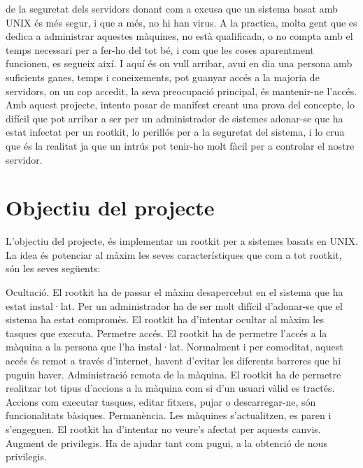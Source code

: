 \documentclass[a4paper]{article}
\begin{document}
de la seguretat dels servidors donant com a excusa que un sistema basat amb UNIX és
més segur, i que a més, no hi han virus. A la practica, molta gent que es dedica a
administrar aquestes màquines, no està qualificada, o no compta amb el temps necessari
per a fer-ho del tot bé, i com que les coses aparentment funcionen, es segueix així.
I aquí és on vull arribar, avui en dia una persona amb suficients ganes, temps i
coneixements, pot guanyar accés a la majoria de servidors, on un cop accedit, la seva
preocupació principal, és mantenir-ne l'accés.
Amb aquest projecte, intento posar de manifest creant una prova del concepte, lo difícil
que pot arribar a ser per un administrador de sistemes adonar-se que ha estat infectat per
un rootkit, lo perillós per a la seguretat del sistema, i lo crua que és la realitat ja que un
intrús pot tenir-ho molt fàcil per a controlar el nostre servidor.

\section{Objectiu del projecte}

L'objectiu del projecte, és implementar un rootkit per a sistemes basats en UNIX. La idea
és potenciar al màxim les seves característiques que com a tot rootkit, són les seves
següents:

Ocultació. El rootkit ha de passar el màxim desapercebut en el sistema que ha
estat instal·lat. Per un administrador ha de ser molt difícil d'adonar-se que el
sistema ha estat compromès. El rootkit ha d'intentar ocultar al màxim les tasques
que executa.
Permetre accés. El rootkit ha de permetre l'accés a la màquina a la persona que
l'ha instal·lat. Normalment i per comoditat, aquest accés és remot a través
d'internet, havent d'evitar les diferents barreres que hi puguin haver.
Administració remota de la màquina. El rootkit ha de permetre realitzar tot tipus
d'accions a la màquina com si d'un usuari vàlid es tractés. Accions com executar
tasques, editar fitxers, pujar o descarregar-ne, són funcionalitats bàsiques.
Permanència. Les màquines s'actualitzen, es paren i s'engeguen. El rootkit ha
d'intentar no veure's afectat per aquests canvis.
Augment de privilegis. Ha de ajudar tant com pugui, a la obtenció de nous
privilegis.



%
\end{document}
